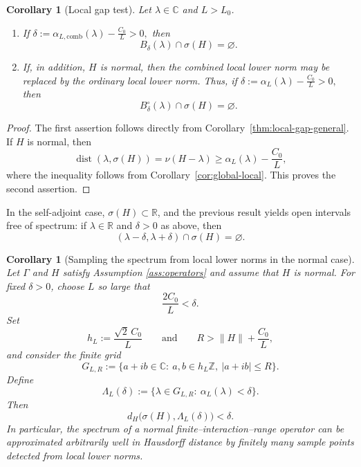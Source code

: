 \documentclass[11pt]{article}
\newtheorem{corollary}[theorem]{Corollary}
\theoremstyle{definition}
\newcommand{\C}{\mathbb{C}}
\newcommand{\Z}{\mathbb{Z}}
\newcommand{\R}{\mathbb{R}}
\newcommand{\dist}{\operatorname{dist}}
\begin{document}
\begin{corollary}[Local gap test]
\label{cor:local-gap}
Let $\lambda\in\C$ and $L>L_0$.

\begin{enumerate}
\item If $\delta:=\alpha_{L,\mathrm{comb}}(\lambda)-\frac{C_0}{L}>0, $
then
\[
  B_\delta(\lambda)\cap\sigma(H)=\varnothing.
\]

\item If, in addition, $H$ is normal, then the combined local lower norm may be
replaced by the ordinary local lower norm. Thus, if
$ \delta:=\alpha_L(\lambda)-\frac{C_0}{L}>0,$
then
\[
  B_\delta^\circ(\lambda)\cap\sigma(H)=\varnothing.
\]
\end{enumerate}
\end{corollary}

\begin{proof}
The first assertion follows directly from
Corollary~\ref{thm:local-gap-general}. If $H$ is normal, then
\[
  \dist(\lambda,\sigma(H))=\nu(H-\lambda)
  \ge \alpha_L(\lambda)-\frac{C_0}{L},
\]
where the inequality follows from Corollary~\ref{cor:global-local}. This proves the
second assertion.
\end{proof}

\medskip

\noindent
In the self-adjoint case, $\sigma(H)\subset\R$, and the previous result yields
open intervals free of spectrum:
if $\lambda\in\R$ and $\delta>0$ as above, then
\[
  (\lambda-\delta,\lambda+\delta)\cap\sigma(H)=\varnothing.
\]

\begin{corollary}[Sampling the spectrum from local lower norms in the normal case]
\label{cor:normal-sampling-grid}
Let $\Gamma$ and $H$ satisfy Assumption \ref{ass:operators} and assume that $H$ is normal. 
For fixed $\delta>0$, choose $L$ so large that
\[
  \frac{2C_0}{L}<\delta.
\]
Set
\[
  h_L:=\frac{\sqrt2\,C_0}{L}
  \qquad\text{and}\qquad
  R>\|H\|+\frac{C_0}{L},
\]
and consider the finite grid
\[
  G_{L,R}
  :=\bigl\{a+ib\in\C:\ a,b\in h_L\Z,\ |a+ib|\le R\bigr\}.
\]
Define
\[
  \Lambda_L(\delta)
  :=\bigl\{\lambda\in G_{L,R}:\ \alpha_L(\lambda)<\delta\bigr\}.
\]
Then
\[
  d_H\bigl(\sigma(H),\Lambda_L(\delta)\bigr)<\delta.
\]
In particular, the spectrum of a normal finite--interaction--range operator can be
approximated arbitrarily well in Hausdorff distance by finitely many sample
points detected from local lower norms.
\end{corollary}
\end{document}
